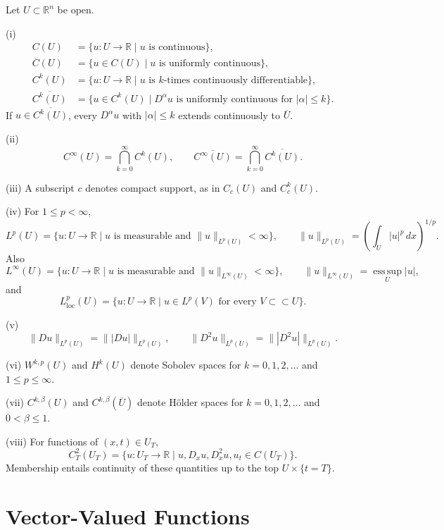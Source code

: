 \begin{definition}
\label{def:function-space-notation}

Let $U\subset\mathbb R^n$ be open.

(i)
\[
\begin{aligned}
C(U)&=\{u:U\to\mathbb R\mid u\text{ is continuous}\},\\
\overline C(U)&=\{u\in C(U)\mid u\text{ is uniformly continuous}\},\\
C^k(U)&=\{u:U\to\mathbb R\mid u\text{ is }k\text{-times continuously differentiable}\},\\
\overline{C^k(U)}&=\{u\in C^k(U)\mid D^\alpha u\text{ is uniformly continuous for }|\alpha|\leq k\}.
\end{aligned}
\]
If $u\in\overline{C^k(U)}$, every $D^\alpha u$ with $|\alpha|\leq k$ extends continuously to $\overline U$.

(ii)
\[
C^\infty(U)=\bigcap_{k=0}^\infty C^k(U),
\qquad
\overline{C^\infty(U)}=\bigcap_{k=0}^\infty\overline{C^k(U)}.
\]

(iii) A subscript $c$ denotes compact support, as in $C_c(U)$ and $C_c^k(U)$.

(iv) For $1\leq p<\infty$,
\[
L^p(U)=\{u:U\to\mathbb R\mid u\text{ is measurable and }\|u\|_{L^p(U)}<\infty\},
\qquad
\|u\|_{L^p(U)}=\left(\int_U|u|^p\,dx\right)^{1/p}.
\]
Also
\[
L^\infty(U)=\{u:U\to\mathbb R\mid u\text{ is measurable and }\|u\|_{L^\infty(U)}<\infty\},
\qquad
\|u\|_{L^\infty(U)}=\operatorname*{ess\,sup}_U|u|,
\]
and
\[
L^p_{\mathrm{loc}}(U)=\{u:U\to\mathbb R\mid u\in L^p(V)\text{ for every }V\subset\subset U\}.
\]

(v)
\[
\|Du\|_{L^p(U)}=\||Du|\|_{L^p(U)},
\qquad
\|D^2u\|_{L^p(U)}=\||D^2u|\|_{L^p(U)}.
\]

(vi) $W^{k,p}(U)$ and $H^k(U)$ denote Sobolev spaces for $k=0,1,2,\ldots$ and $1\leq p\leq\infty$.

(vii) $C^{k,\beta}(U)$ and $C^{k,\beta}(\overline U)$ denote H\"older spaces for $k=0,1,2,\ldots$ and $0<\beta\leq1$.

(viii) For functions of $(x,t)\in U_T$,
\[
C_T^2(U_T)=\{u:U_T\to\mathbb R
\mid u,D_xu,D_x^2u,u_t\in C(U_T)\}.
\]
Membership entails continuity of these quantities up to the top $U\times\{t=T\}$.
\end{definition}

\section{Vector-Valued Functions}
\label{sec:vector-valued-functions}

